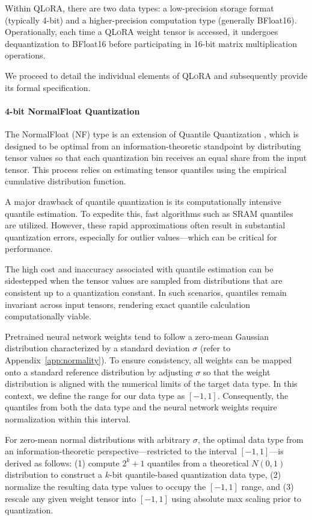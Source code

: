 Within \textsc{QLoRA}, there are two data types: a low-precision storage format (typically 4-bit) and a higher-precision computation type (generally BFloat16). Operationally, each time a \textsc{QLoRA} weight tensor is accessed, it undergoes dequantization to BFloat16 before participating in 16-bit matrix multiplication operations.

We proceed to detail the individual elements of \textsc{QLoRA} and subsequently provide its formal specification.

\paragraph{4-bit NormalFloat Quantization} The NormalFloat (NF) type is an extension of Quantile Quantization \citep{dettmers2022optimizers}, which is designed to be optimal from an information-theoretic standpoint by distributing tensor values so that each quantization bin receives an equal share from the input tensor. This process relies on estimating tensor quantiles using the empirical cumulative distribution function.

A major drawback of quantile quantization is its computationally intensive quantile estimation. To expedite this, fast algorithms such as SRAM quantiles~\citep{dettmers2022optimizers} are utilized. However, these rapid approximations often result in substantial quantization errors, especially for outlier values—which can be critical for performance.

The high cost and inaccuracy associated with quantile estimation can be sidestepped when the tensor values are sampled from distributions that are consistent up to a quantization constant. In such scenarios, quantiles remain invariant across input tensors, rendering exact quantile calculation computationally viable.

Pretrained neural network weights tend to follow a zero-mean Gaussian distribution characterized by a standard deviation $\sigma$ (refer to Appendix~\ref{app:normality}). To ensure consistency, all weights can be mapped onto a standard reference distribution by adjusting $\sigma$ so that the weight distribution is aligned with the numerical limits of the target data type. In this context, we define the range for our data type as $[-1, 1]$. Consequently, the quantiles from both the data type and the neural network weights require normalization within this interval.

For zero-mean normal distributions with arbitrary $\sigma$, the optimal data type from an information-theoretic perspective—restricted to the interval $[-1, 1]$—is derived as follows: (1) compute $2^k+1$ quantiles from a theoretical $N(0, 1)$ distribution to construct a $k$-bit quantile-based quantization data type, (2) normalize the resulting data type values to occupy the $[-1, 1]$ range, and (3) rescale any given weight tensor into $[-1, 1]$ using absolute max scaling prior to quantization.


